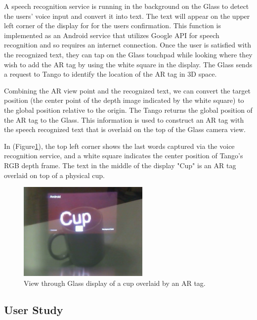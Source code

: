 A speech recognition service is running in the background on the Glass to detect the users' voice input and convert it into text. The text will appear on the upper left corner of the display for for the users confirmation. This function is implemented as an Android service that utilizes Google API for speech recognition and so requires an internet connection. Once the user is satisfied with the recognized text, they can tap on the Glass touchpad while looking where they wish to add the AR tag by using the white square in the display. The Glass sends a request to Tango to identify the location of the AR tag in 3D space.

Combining the AR view point and the recognized text, we can convert the target position (the center point of the depth image indicated by the white square) to the global position relative to the origin. The Tango returns the global position of the AR tag to the Glass. This information is used to construct an AR tag with the speech recognized text that is overlaid on the top of the Glass camera view.

In (Figure\ref{fig:mgia16:ui}), the top left corner shows the last words captured via the voice recognition service, and a white square indicates the center position of Tango's RGB depth frame. The text in the middle of the display "Cup" is an AR tag overlaid on top of a physical cup. 
%
%

\begin{figure}[ht]
  \centering
  \includegraphics[width=2.5in]{images/mgia16/WIN_20150614_204531_2}
  \caption{View through Glass display of a cup overlaid by an AR tag.}
  \label{fig:mgia16:ui}
\end{figure}


\subsection{User Study }

